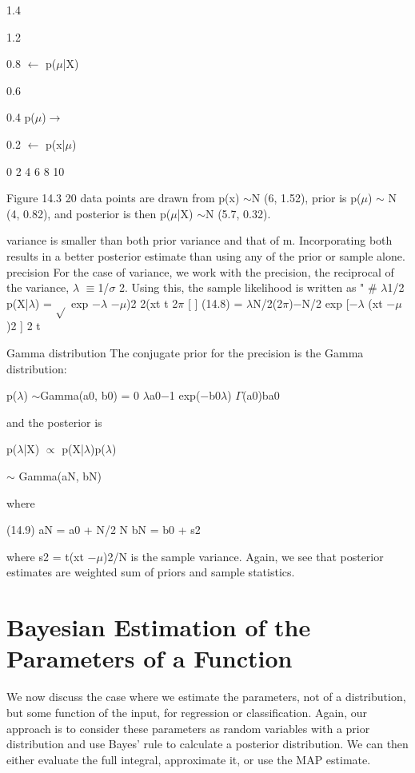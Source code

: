 1.4

1.2

0.8 $\leftarrow$ p($\mu$|X)

0.6

0.4 p($\mu$)$\to$

0.2 $\leftarrow$ p(x|$\mu$)

0 2 4 6 8 10

Figure 14.3 20 data points are drawn from p(x) $\sim$N (6, 1.52), prior is p($\mu$) $\sim$ N (4, 0.82), and posterior is then p($\mu$|X) $\sim$N (5.7, 0.32).

variance is smaller than both prior variance and that of m. Incorporating both results in a better posterior estimate than using any of the prior or sample alone. precision For the case of variance, we work with the precision, the reciprocal of the variance, $\lambda$ $\equiv$1/$\sigma$ 2. Using this, the sample likelihood is written as " \# $\lambda$1/2 p(X|$\lambda$) = $\sqrt{}$ exp $-$$\lambda$ $-$$\mu$)2 2(xt t 2$\pi$ [ ] (14.8) = $\lambda$N/2(2$\pi$)$-$N/2 exp [$-$$\lambda$ (xt $-$$\mu$)2 ] 2 t

Gamma distribution The conjugate prior for the precision is the Gamma distribution:

p($\lambda$) $\sim$Gamma(a0, b0) = 0 $\lambda$a0$-$1 exp($-$b0$\lambda$) $\Gamma$(a0)ba0

and the posterior is

p($\lambda$|X) $\propto$ p(X|$\lambda$)p($\lambda$)

$\sim$ Gamma(aN, bN)

where

(14.9) aN = a0 + N/2 N bN = b0 + s2

where s2 = t(xt $-$$\mu$)2/N is the sample variance. Again, we see that posterior estimates are weighted sum of priors and sample statistics.

\section{Bayesian Estimation of the Parameters of a Function}

We now discuss the case where we estimate the parameters, not of a distribution, but some function of the input, for regression or classification. Again, our approach is to consider these parameters as random variables with a prior distribution and use Bayes’ rule to calculate a posterior distribution. We can then either evaluate the full integral, approximate it, or use the MAP estimate.

